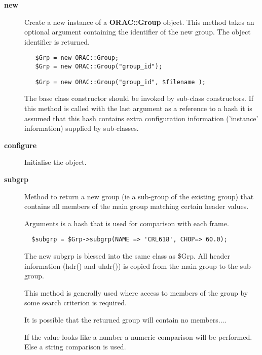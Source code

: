 \begin{description}

\item[{\textbf{new}}] \mbox{}

Create a new instance of a \textbf{ORAC::Group} object.
This method takes an optional argument containing the
identifier of the new group. The object identifier is returned.

\begin{verbatim}
   $Grp = new ORAC::Group;
   $Grp = new ORAC::Group("group_id");
\end{verbatim}
\begin{verbatim}
   $Grp = new ORAC::Group("group_id", $filename );
\end{verbatim}


The base class constructor should be invoked by sub-class constructors.
If this method is called with the last argument as a reference to
a hash it is assumed that this hash contains extra configuration
information ('instance' information) supplied by sub-classes.


\item[{\textbf{configure}}] \mbox{}

Initialise the object.


\item[{\textbf{subgrp}}] \mbox{}

Method to return a new group (ie a sub-group of the existing
group) that contains all members of the main group matching
certain header values.



Arguments is a hash that is used for comparison with each
frame.

\begin{verbatim}
  $subgrp = $Grp->subgrp(NAME => 'CRL618', CHOP=> 60.0);
\end{verbatim}


The new subgrp is blessed into the same class as \$Grp.
All header information (hdr() and uhdr()) is copied
from the main group to the sub-group.



This method is generally used where access to members of the
group by some search criterion is required.



It is possible that the returned group will contain no
members....



If the value looks like a number a numeric comparison will be performed.
Else a string comparison is used.



\end{description}
